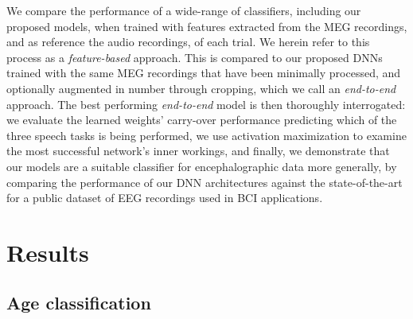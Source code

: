 \documentclass[fleqn,10pt]{wlscirep}
\begin{document}
We compare the performance of a wide-range of classifiers, including our proposed models, when trained with features extracted from the MEG recordings, and as reference the audio recordings, of each trial. We herein refer to this process as a {\em feature-based} approach. This is compared to our proposed DNNs trained with the same MEG recordings that have been minimally processed, and optionally augmented in number through cropping, which we call an {\em end-to-end} approach. The best performing {\em end-to-end} model is then thoroughly interrogated: we evaluate the learned weights' carry-over performance predicting which of the three speech tasks is being performed, we use activation maximization to examine the most successful network's inner workings, and finally, we demonstrate that our models are a suitable classifier for encephalographic data more generally, by comparing the performance of our DNN architectures against the state-of-the-art for a public dataset of EEG recordings used in BCI applications.

\section*{Results}

\subsection*{Age classification}
\end{document}
